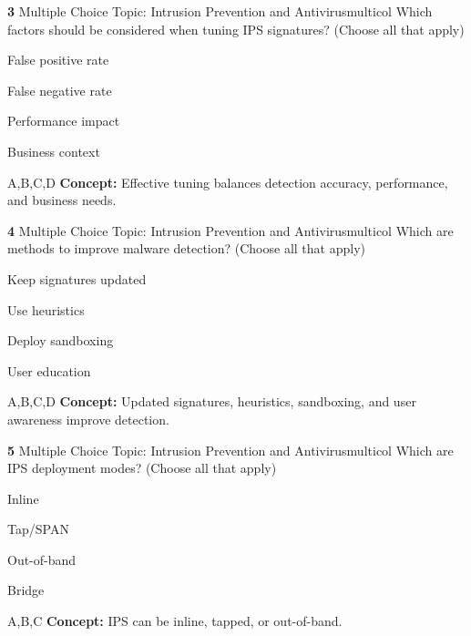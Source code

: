 \documentclass[10pt,a4paper]{article}
\begin{document}
\begin{qcard}{\color{white}\textbf{3} \hfill \small Multiple Choice \textbar{} Topic: Intrusion Prevention and Antivirus}{multicol}
Which factors should be considered when tuning IPS signatures? (Choose all that apply)

\begin{qoptions}
\item False positive rate
\item False negative rate
\item Performance impact
\item Business context
\end{qoptions}
\begin{explainbox}{A,B,C,D}
\textbf{Concept:} Effective tuning balances detection accuracy, performance, and business needs.
\end{explainbox}
\end{qcard}

\begin{qcard}{\color{white}\textbf{4} \hfill \small Multiple Choice \textbar{} Topic: Intrusion Prevention and Antivirus}{multicol}
Which are methods to improve malware detection? (Choose all that apply)

\begin{qoptions}
\item Keep signatures updated
\item Use heuristics
\item Deploy sandboxing
\item User education
\end{qoptions}
\begin{explainbox}{A,B,C,D}
\textbf{Concept:} Updated signatures, heuristics, sandboxing, and user awareness improve detection.
\end{explainbox}
\end{qcard}

\begin{qcard}{\color{white}\textbf{5} \hfill \small Multiple Choice \textbar{} Topic: Intrusion Prevention and Antivirus}{multicol}
Which are IPS deployment modes? (Choose all that apply)

\begin{qoptions}
\item Inline
\item Tap/SPAN
\item Out-of-band
\item Bridge
\end{qoptions}
\begin{explainbox}{A,B,C}
\textbf{Concept:} IPS can be inline, tapped, or out-of-band.
\end{explainbox}
\end{qcard}
\end{document}
